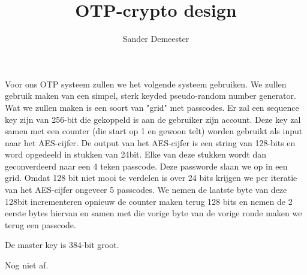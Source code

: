 \documentclass[10pt,a4paper]{report}
\author{Sander Demeester}
\title{OTP-crypto design}
\begin{document}
Voor ons OTP systeem zullen we het volgende systeem gebruiken.
We zullen gebruik maken van een simpel, sterk keyded pseudo-random number generator. Wat we zullen maken is een soort van "grid" met passcodes. Er zal een sequence key zijn van 256-bit die gekoppeld is aan de gebruiker zijn account. 
Deze key zal samen met een counter (die start op 1 en gewoon telt) worden gebruikt als input naar het AES-cijfer. 
De output van het AES-cijfer is een string van 128-bits en word opgedeeld in stukken van 24bit. Elke van deze stukken wordt dan geconverdeerd naar een 4 teken passcode. Deze passworde slaan we op in een grid. Omdat 128 bit niet mooi te verdelen is over 24 bits krijgen we per iteratie van het AES-cijfer ongeveer 5 passcodes. We nemen de laatste byte van deze 128bit incrementeren opnieuw de counter maken terug 128 bits en nemen de 2 eerste bytes hiervan en samen met die vorige byte van de vorige ronde maken we terug een passcode.

De master key is 384-bit groot. 

Nog niet af.
\end{document}
